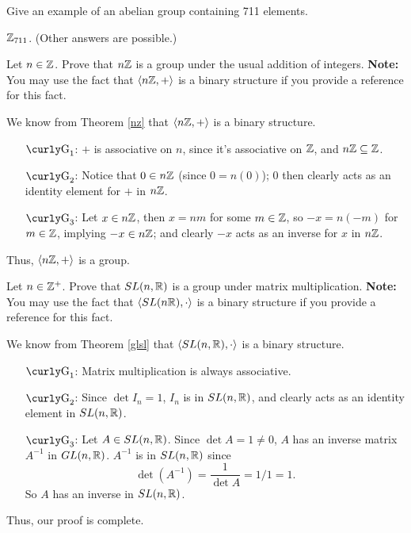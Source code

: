 \begin{exercise}[ID=2K]
Give an example of an abelian group containing 711 elements.
\end{exercise}

\begin{solution}[print=false]
$\mathbb{Z}_{711}$. (Other answers are possible.)
\end{solution}



\begin{exercise}[ID=2M]
Let $n\in \mathbb{Z}$.   Prove that $n\mathbb{Z}$ is a group under the usual addition of integers. \textbf{Note:} You may use the fact that $\langle n\mathbb{Z},+\rangle$ is a binary structure if you provide a reference for this fact.
\end{exercise}

\begin{solution}[print=false]
We know from Theorem \ref{nz} that $\langle n\mathbb{Z},+\rangle$ is a binary structure.

\begin{enumerate}
\item[$\G_1$:] $+$ is
    associative on $n$, since it's associative on
    $\mathbb{Z}$, and $n\mathbb{Z} \subseteq \mathbb{Z}$.

\item[$\G_2$:] Notice that
    $0\in n\mathbb{Z}$ (since $0=n(0)$); 0 then clearly acts as
    an identity element for $+$ in $n\mathbb{Z}$.

\item[$\G_3$:] Let $x\in n\mathbb{Z}$, then $x=nm$ for some $m\in \mathbb{Z}$, so
    $-x=n(-m)$ for $m\in \mathbb{Z}$, implying $-x\in n\mathbb{Z}$;
    and clearly $-x$ acts as an inverse for $x$ in
    $n\mathbb{Z}$.

    \end{enumerate}Thus, $\langle n\mathbb{Z}, +\rangle$ is a group.

    \end{solution}

\begin{exercise}[ID=2N]
 Let $n\in \mathbb{Z}^+$. Prove that $SL(n,\mathbb{R})$  is a group under matrix multiplication.
\textbf{Note:} You may use the fact that $\langle SL(n\mathbb{R}),\cdot\rangle$ is a binary structure if you provide a reference for this fact.
\end{exercise}


\begin{solution}[print=false]
We know from Theorem \ref{glsl} that $\langle SL(n,\mathbb{R}),\cdot\rangle$ is a binary structure.

\begin{enumerate}
\item[$\G_1$:] Matrix multiplication is always associative.

\item[$\G_2$:] Since $\det I_n=1$, $I_n$ is in $SL(n,\mathbb{R})$, and clearly acts as an identity element in $SL(n,\mathbb{R})$.

\item[$\G_3$:] Let $A\in SL(n,\mathbb{R})$.  Since $\det A=1\neq 0$, $A$ has an inverse matrix $A^{-1}$ in $GL(n, \mathbb{R})$.  $A^{-1}$ is in $SL(n,\mathbb{R})$ since $$\det(A^{-1})=\frac{1}{\det A}=1/1=1.$$ So $A$ has an inverse in $SL(n,\mathbb{R})$.
\end{enumerate}
Thus, our proof is complete.
\end{solution}



